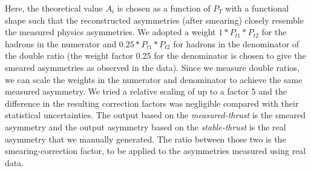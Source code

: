   Here, the theoretical value $A_{i}$ is chosen as a function of $P_T$ with a functional shape such that the reconstructed asymmetries (after smearing) closely resemble the measured physics asymmetries.
We adopted  a weight $1*P_{t1}*P_{t2}$ for the hadrons in the numerator and $0.25*P_{t1}*P_{t2}$ for hadrons in the denominator of the double ratio (the weight factor 0.25 for the denominator is chosen to
give the smeared asymmetries as observed in the data). 
Since we measure double ratios, we can scale the weights in the numerator and denominator to achieve the same measured asymmetry. We tried a relative scaling of up to a factor 5 and 
the difference in the resulting correction factors was negligible compared with their statistical uncertainties.
 The output based on the {\em measured-thrust} is the smeared asymmetry and the output asymmetry based on the {\em stable-thrust} is the real asymmetry that we manually generated. The ratio between those two is the smearing-correction factor, to be applied to the asymmetries measured using real data.
 

 


